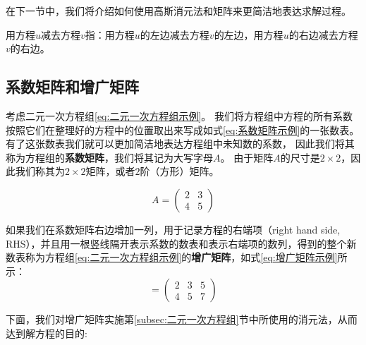 \documentclass[lang=cn,newtx,10pt,scheme=chinese]{elegantbook}
\begin{document}
在下一节中，我们将介绍如何使用高斯消元法和矩阵来更简洁地表达求解过程。

\vspace{0.5cm}

\begin{note}
    用方程$u$减去方程$v$指：用方程$u$的左边减去方程$v$的左边，用方程$u$的右边减去方程$v$的右边。
\end{note}

\subsection{系数矩阵和增广矩阵}
\label{subsec:系数矩阵和增广矩阵}

考虑二元一次方程组\ref{eq:二元一次方程组示例}。
我们将方程组中方程的所有系数按照它们在整理好的方程中的位置取出来写成如式\ref{eq:系数矩阵示例}的一张数表。
有了这张数表我们就可以更加简洁地表达方程组中未知数的系数，
因此我们将其称为方程组的\textcolor{third}{\bf 系数矩阵}，我们将其记为大写字母$A$。
由于矩阵$A$的尺寸是$2\times 2$，因此我们称其为$2\times 2$矩阵，或者$2$阶（方形）矩阵。

\begin{equation}
  A = \left(\begin{array}{ll}
2 & 3 \\
4 & 5
\end{array}\right)
\label{eq:系数矩阵示例}
\end{equation}

如果我们在系数矩阵右边增加一列，用于记录方程的右端项（right hand side, RHS），并且用一根竖线隔开表示系数的数表和表示右端项的数列，得到的整个新数表称为方程组\ref{eq:二元一次方程组示例}的\textcolor{third}{\bf 增广矩阵}，如式\ref{eq:增广矩阵示例}所示：
\begin{equation}
    [A \mid B]=\left(\begin{array}{cc|c}
2 & 3 & 5 \\
4 & 5 & 7
\end{array}\right)
\label{eq:增广矩阵示例}
\end{equation}

下面，我们对增广矩阵实施第\ref{subsec:二元一次方程组}节中所使用的消元法，从而达到解方程的目的:
\end{document}
